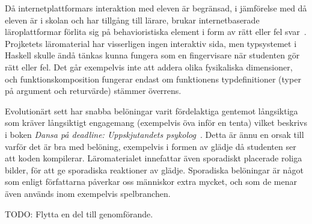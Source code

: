 \begin{draft}

Då internetplattformars interaktion med eleven är begränsad, i jämförelse med då
eleven är i skolan och har tillgång till lärare, brukar internetbaserade
läroplattformar förlita sig på behavioristiska element i form av rätt eller fel
svar~\cite{LSB_und}. Projketets läromaterial har visserligen ingen interaktiv sida,
men typsystemet i Haskell skulle ändå tänkas kunna fungera som en fingervisare
när studenten gör rätt eller fel. Det går exempelvis inte att addera olika fysikaliska dimensioner, och funktionskomposition fungerar endast om funktionens
typdefinitioner (typer på argument och returvärde) stämmer överrens.

Evolutionärt sett har snabba belöningar varit fördelaktiga gentemot långsiktiga
som kräver långsiktigt engagemang (exempelvis öva inför en tenta) vilket beskrivs i
boken \textit{Dansa på deadline: Uppskjutandets psykolog}~\cite{DPD}. Detta är ännu en
orsak till varför det är bra med belöning, exempelvis i formen av glädje då studenten
ser att koden kompilerar. Läromaterialet innefattar även sporadiskt placerade
roliga bilder, för att ge sporadiska reaktioner av glädje. Sporadiska belöningar
är något som enligt författarna påverkar oss människor extra mycket, och som de
menar även används inom exempelvis spelbranchen.

TODO: Flytta en del till genomförande.

\end{draft}
